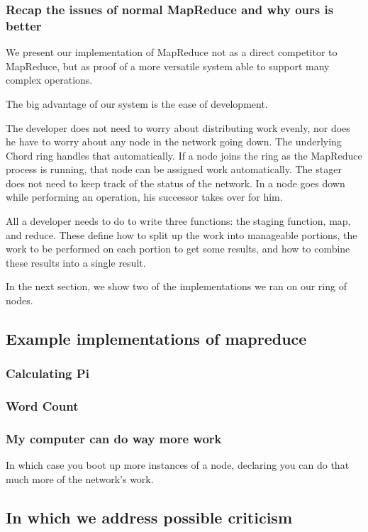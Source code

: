 \documentclass[conference, compsocconf, letterpaper]{IEEEtran}
\begin{document}
\subsubsection{Recap the issues  of normal MapReduce  and why ours is better} 
We present our implementation of MapReduce not as a direct competitor to MapReduce, but as proof of a more versatile system able to support many complex operations.

The big advantage of our system is the ease of development.  

The developer does not need to worry about distributing work evenly, nor does he have to worry about any node in the network going down.  The underlying Chord ring handles that automatically.  If a node joins the ring as the MapReduce process is running, that node can be assigned work automatically.  The stager does not need to keep track of the status of the network.  In a node goes down while performing an operation, his successor takes over for him.

All a developer needs to do to write three functions: the staging function, map, and reduce.  These define how to split up the work into manageable portions,  the  work to be performed on each portion to get some results, and how to combine these results into a single result. 

In the next section, we show two of the implementations we ran on our ring of nodes.

\subsection{Example implementations of mapreduce}

\subsubsection{Calculating Pi}

\subsubsection{Word Count}

\subsubsection{My computer can do way more work}  In which case you boot up more instances of a node, declaring you can do that much more of the network's work.


\subsection{In which we address possible criticism}
\end{document}
